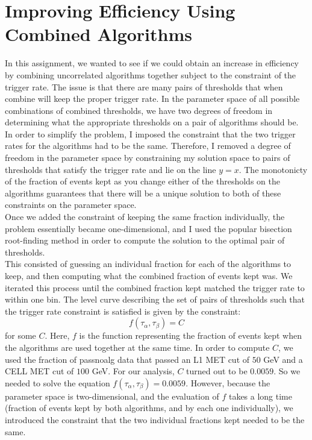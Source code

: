 \chapter{Improving Efficiency Using Combined Algorithms}
In this assignment, we wanted to see if we could obtain an increase in efficiency by combining uncorrelated algorithms together subject to the constraint of the trigger rate. The issue is that there are many pairs of thresholds that when combine will keep the proper trigger rate. In the parameter space of all possible combinations of combined thresholds, we have two degrees of freedom in determining what the appropriate thresholds on a pair of algorithms should be. 
In order to simplify the problem, I imposed the constraint that the two trigger rates for the algorithms had to be the same. Therefore, I removed a degree of freedom in the parameter space by constraining my solution space to pairs of thresholds that satisfy the trigger rate and lie on the line $y=x$. The monotonicty of the fraction of events kept as you change either of the thresholds on the algorithms guarantees that there will be a unique solution to both of these constraints on the parameter space. \\
Once we added the constraint of keeping the same fraction individually, the problem essentially became one-dimensional, and I used the popular bisection root-finding method in order to compute the solution to the optimal pair of thresholds. \\
This consisted of guessing an individual fraction for each of the algorithms to keep, and then computing what the combined fraction of events kept was. We iterated this process until the combined fraction kept matched the trigger rate to within one bin.
The level curve describing the set of pairs of thresholds such that the trigger rate constraint is satisfied is given by the constraint:
$$f(\tau_{\alpha},\tau_{\beta})=C$$
for some $C$. Here, $f$ is the function representing the fraction of events kept when the algorithms are used together at the same time. 
In order to compute $C$, we used the fraction of passnoalg data that passed an L1 MET cut of $50$ GeV and a CELL MET cut of $100$ GeV. 
For our analysis, $C$ turned out to be $0.0059$.
So we needed to solve the equation $f(\tau_{\alpha},\tau_{\beta})=0.0059$. 
However, because the parameter space is two-dimensional, and the evaluation of $f$ takes a long time (fraction of events kept by both algorithms, and by each one individually), we introduced the constraint that the two individual fractions kept needed to be the same.
